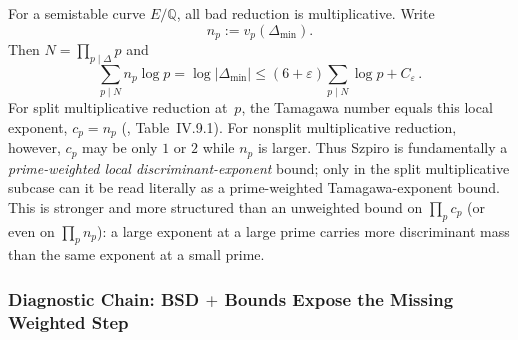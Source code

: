 \documentclass[aps,prd,twocolumn,superscriptaddress,nofootinbib,floatfix]{revtex4-2}
\theoremstyle{definition}
\theoremstyle{remark}
\begin{document}
For a semistable curve $E/\mathbb{Q}$, all bad reduction is multiplicative.  Write
\[
  n_p := v_p(\Delta_{\min}) .
\]
Then $N = \prod_{p \mid \Delta} p$ and
\begin{equation}
\sum_{p \mid N} n_p \log p
= \log|\Delta_{\min}|
\leq (6+\varepsilon)\sum_{p \mid N}\log p + C_\varepsilon\,.
\label{eq:szpiro_tamagawa}
\end{equation}
For split multiplicative reduction at~$p$, the Tamagawa number equals this local exponent, $c_p=n_p$ (\cite{Silverman2009}, Table~IV.9.1).  For nonsplit multiplicative reduction, however, $c_p$ may be only $1$ or $2$ while $n_p$ is larger.  Thus Szpiro is fundamentally a \emph{prime-weighted local discriminant-exponent} bound; only in the split multiplicative subcase can it be read literally as a prime-weighted Tamagawa-exponent bound.  This is stronger and more structured than an unweighted bound on $\prod_p c_p$ (or even on $\prod_p n_p$): a large exponent at a large prime carries more discriminant mass than the same exponent at a small prime.

\subsubsection{\texorpdfstring{Diagnostic Chain: BSD $+$ Bounds Expose the Missing Weighted Step}{Diagnostic Chain: BSD + Bounds Expose the Missing Weighted Step}}
\end{document}
